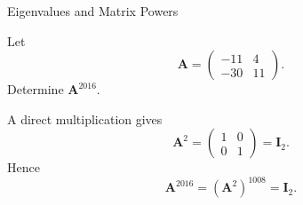 \begin{expectedproblemgroup}{Eigenvalues and Matrix Powers}
        \begin{expectedsubproblem}
            Let
            \[
                \mathbf{A}
                =
                \begin{pmatrix}
                    -11 & 4\\
                    -30 & 11
                \end{pmatrix}.
            \]
            Determine $\mathbf{A}^{2016}$.
        \end{expectedsubproblem}

        \begin{expectedsubsolution}
            A direct multiplication gives
            \[
                \mathbf{A}^2
                =
                \begin{pmatrix}
                    1&0\\
                    0&1
                \end{pmatrix}
                =
                \mathbf{I}_2.
            \]
            Hence
            \[
                \mathbf{A}^{2016}
                =
                (\mathbf{A}^2)^{1008}
                =
                \boxed{\mathbf{I}_2}.
            \]
        \end{expectedsubsolution}

    \end{expectedproblemgroup}

